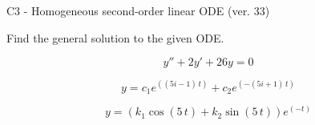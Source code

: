 \begin{exercise}
  \begin{exerciseTitle}C3 - Homogeneous second-order linear ODE (ver. 33)\end{exerciseTitle}
  \begin{exerciseStatement}
    
Find the general solution to the given ODE.

    
\[y''+2y'+26y = 0\]

  \end{exerciseStatement}
  \begin{exerciseAnswer}
    
\[y= c_{1} e^{\left(\left(5 i - 1\right) \, t\right)} + c_{2} e^{\left(-\left(5 i + 1\right) \, t\right)}\]

    
\[y= {\left(k_{1} \cos\left(5 \, t\right) + k_{2} \sin\left(5 \, t\right)\right)} e^{\left(-t\right)}\]

  \end{exerciseAnswer}
\end{exercise}